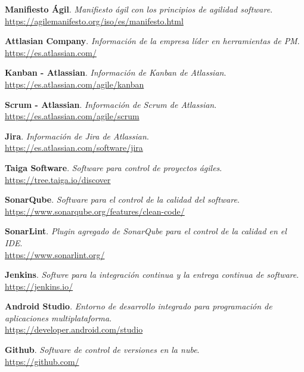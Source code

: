 \begin{thebibliography}{X}

\textbf{Manifiesto Ágil}. \textit{Manifiesto ágil con los principios de agilidad software}. \\
\small{\url{https://agilemanifesto.org/iso/es/manifesto.html}}

\textbf{Attlasian Company}. \textit{Información de la empresa líder en herramientas de PM}. \\
\small{\url{https://es.atlassian.com/}}

\textbf{Kanban - Atlassian}. \textit{Información de Kanban de Atlassian}. \\
\small{\url{https://es.atlassian.com/agile/kanban}}

\textbf{Scrum - Atlassian}. \textit{Información de Scrum de Atlassian}. \\
\small{\url{https://es.atlassian.com/agile/scrum}}

\textbf{Jira}. \textit{Información de Jira de Atlassian}. \\
\small{\url{https://es.atlassian.com/software/jira}}

\textbf{Taiga Software}. \textit{Software para control de proyectos ágiles}. \\
\small{\url{https://tree.taiga.io/discover}}

\textbf{SonarQube}. \textit{Software para el control de la calidad del software}. \\
\small{\url{https://www.sonarqube.org/features/clean-code/}}

\textbf{SonarLint}. \textit{Plugin agregado de SonarQube para el control de la calidad en el IDE}. \\
\small{\url{https://www.sonarlint.org/}}

\textbf{Jenkins}. \textit{Softwre para la integración continua y la entrega continua de software}. \\
\small{\url{https://jenkins.io/}}

\textbf{Android Studio}. \textit{Entorno de desarrollo integrado para programación de aplicaciones multiplataforma}. \\
\small{\url{https://developer.android.com/studio}}

\textbf{Github}. \textit{Software de control de versiones en la nube}. \\
\small{\url{https://github.com/}}


\end{thebibliography}
